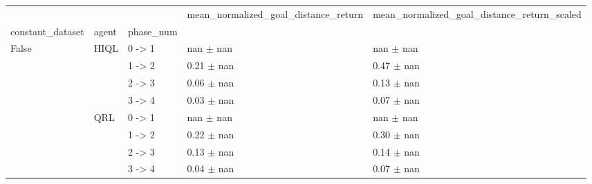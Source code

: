 \begin{tabular}{lllll}
\toprule
 &  &  & mean_normalized_goal_distance_return & mean_normalized_goal_distance_return_scaled \\
constant_dataset & agent & phase_num &  &  \\
\midrule
\multirow[t]{8}{*}{False} & \multirow[t]{4}{*}{HIQL} & 0 -> 1 & nan $\pm$ nan & nan $\pm$ nan \\
 &  & 1 -> 2 & 0.21 $\pm$ nan & 0.47 $\pm$ nan \\
 &  & 2 -> 3 & 0.06 $\pm$ nan & 0.13 $\pm$ nan \\
 &  & 3 -> 4 & 0.03 $\pm$ nan & 0.07 $\pm$ nan \\
\cline{2-5}
 & \multirow[t]{4}{*}{QRL} & 0 -> 1 & nan $\pm$ nan & nan $\pm$ nan \\
 &  & 1 -> 2 & 0.22 $\pm$ nan & 0.30 $\pm$ nan \\
 &  & 2 -> 3 & 0.13 $\pm$ nan & 0.14 $\pm$ nan \\
 &  & 3 -> 4 & 0.04 $\pm$ nan & 0.07 $\pm$ nan \\
\cline{1-5} \cline{2-5}
\bottomrule
\end{tabular}
